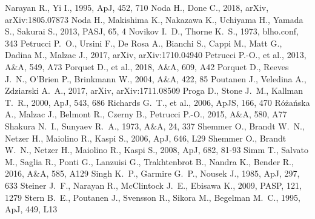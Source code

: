 \documentclass[a4paper,fleqn,usenatbib]{mnras}
\begin{document}
\begin{thebibliography}{99}
 Narayan R., Yi I., 1995, ApJ, 452, 710 %
 Noda H., Done C., 2018, arXiv, arXiv:1805.07873 
 Noda H., Makishima K., Nakazawa K., Uchiyama H., Yamada S., Sakurai S., 2013, PASJ, 65, 4 
 Novikov I.~D., Thorne K.~S., 1973, blho.conf, 343 
 Petrucci P.~O., Ursini F., De Rosa A., Bianchi S., Cappi M., Matt G., Dadina M., Malzac J., 2017, arXiv, arXiv:1710.04940 
 Petrucci P.-O., et al., 2013, A\&A, 549, A73 
 Porquet D., et al., 2018, A\&A, 609, A42 
 Porquet D., Reeves J.~N., O'Brien P., Brinkmann W., 2004, A\&A, 422, 85 
 Poutanen J., Veledina A., Zdziarski A.~A., 2017, arXiv, arXiv:1711.08509
 Proga D., Stone J.~M., Kallman T.~R., 2000, ApJ, 543, 686 
 Richards G.~T., et al., 2006, ApJS, 166, 470 
 R{\'o}{\.z}a{\'n}ska A., Malzac J., Belmont R., Czerny B., Petrucci P.-O., 2015, A\&A, 580, A77 
 Shakura N.~I., Sunyaev R.~A., 1973, A\&A, 24, 337 
 Shemmer O., Brandt W.~N., Netzer H., Maiolino R., Kaspi S., 2006, ApJ, 646, L29 
 Shemmer O., Brandt W.~N., Netzer H., Maiolino R., Kaspi S., 2008, ApJ, 682, 81-93 
 Simm T., Salvato M., Saglia R., Ponti G., Lanzuisi G., Trakhtenbrot B., Nandra K., Bender R., 2016, A\&A, 585, A129 
 Singh K.~P., Garmire G.~P., Nousek J., 1985, ApJ, 297, 633 
 Steiner J.~F., Narayan R., McClintock J.~E., Ebisawa K., 2009, PASP, 121, 1279 
 Stern B.~E., Poutanen J., Svensson R., Sikora M., Begelman M.~C., 1995, ApJ, 449, L13 


\end{thebibliography}
\end{document}
